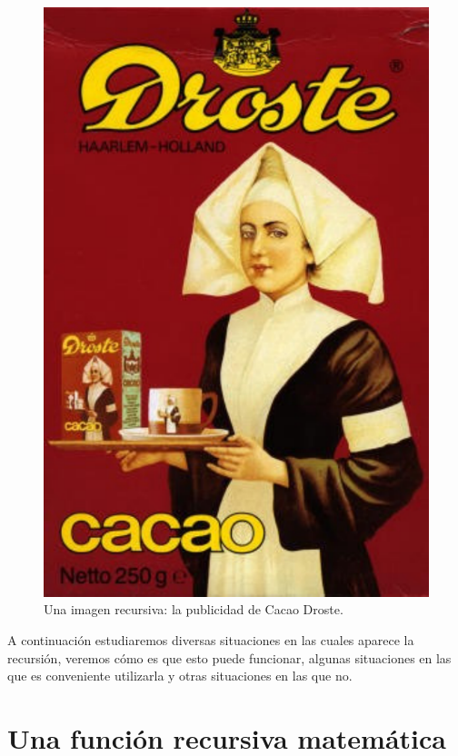 \begin{figure}[h!]
  \centerline{\includegraphics[height=0.5\textheight]{graficos/droste}}
  \caption{Una imagen recursiva: la publicidad de Cacao Droste.}
\end{figure}

A continuación estudiaremos diversas situaciones en las cuales aparece la
recursión, veremos cómo es que esto puede funcionar, algunas situaciones en
las que es conveniente utilizarla y otras situaciones en las que no.

\vspace{2.5cm}

\section{Una función recursiva matemática}


